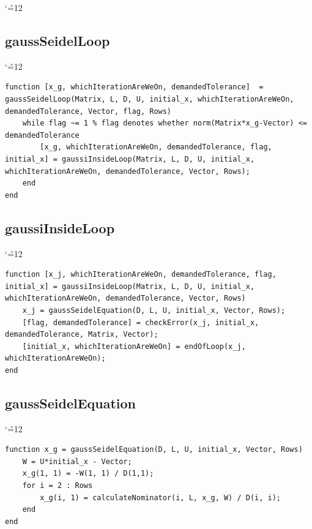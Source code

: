 \documentclass[12pt]{report}
\newenvironment{simplechar}{%
   \catcode`\^=12
}{}
\begin{document}
\begin{simplechar}
\subsection{gaussSeidelLoop}
\begin{simplechar}
\begin{lstlisting}
function [x_g, whichIterationAreWeOn, demandedTolerance]  = gaussSeidelLoop(Matrix, L, D, U, initial_x, whichIterationAreWeOn, demandedTolerance, Vector, flag, Rows)
    while flag ~= 1 % flag denotes whether norm(Matrix*x_g-Vector) <= demandedTolerance
        [x_g, whichIterationAreWeOn, demandedTolerance, flag, initial_x] = gaussiInsideLoop(Matrix, L, D, U, initial_x, whichIterationAreWeOn, demandedTolerance, Vector, Rows);
    end
end
\end{lstlisting}
\end{simplechar}

\subsection{gaussiInsideLoop}
\begin{simplechar}
\begin{lstlisting}
function [x_j, whichIterationAreWeOn, demandedTolerance, flag, initial_x] = gaussiInsideLoop(Matrix, L, D, U, initial_x, whichIterationAreWeOn, demandedTolerance, Vector, Rows)
    x_j = gaussSeidelEquation(D, L, U, initial_x, Vector, Rows);
    [flag, demandedTolerance] = checkError(x_j, initial_x, demandedTolerance, Matrix, Vector);
    [initial_x, whichIterationAreWeOn] = endOfLoop(x_j, whichIterationAreWeOn);
end
\end{lstlisting}
\end{simplechar}

\newpage
\subsection{gaussSeidelEquation}
\begin{simplechar}
\begin{lstlisting}
function x_g = gaussSeidelEquation(D, L, U, initial_x, Vector, Rows)
    W = U*initial_x - Vector;
    x_g(1, 1) = -W(1, 1) / D(1,1);
    for i = 2 : Rows
        x_g(i, 1) = calculateNominator(i, L, x_g, W) / D(i, i);
    end
end
\end{lstlisting}
\end{simplechar}


\end{simplechar}
\end{document}
